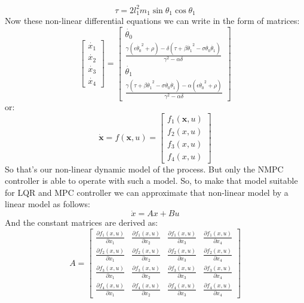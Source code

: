 \begin{equation}\tau = 2l^2_1m_1\sin\theta_1\cos\theta_1\end{equation}
Now these non-linear differential equations we can write in the form of matrices:
\begin{equation}\label{nonlinmodel}
\begin{bmatrix}
\dot{x_1} \\ \dot{x_2} \\ \dot{x_3} \\ \dot{x_4}
\end{bmatrix} = \begin{bmatrix}
\dot{\theta_0}\\
\frac{\gamma(\epsilon\dot{\theta_0}^2+\rho)-\delta(\tau+\beta\dot{\theta_1}^2-\sigma\dot{\theta_0}\dot{\theta_1})}{\gamma^2-\alpha\delta}\\
\dot{\theta_1}\\
 \frac{\gamma(\tau+\beta\dot{\theta_1}^2-\sigma\dot{\theta_0}\dot{\theta_1})-\alpha(\epsilon\dot{\theta_0}^2+\rho)}{\gamma^2-\alpha\delta}
\end{bmatrix}
\end{equation}
or:
\begin{equation}\dot{\textbf{x}} = f(\textbf{x},u) =\begin{bmatrix}f_1(\textbf{x},u)\\f_2(x,u)\\f_3(x,u)\\f_4(x,u)\end{bmatrix} \end{equation}
So that’s our non-linear dynamic model of the process. But only the NMPC controller is able to operate with such a model.  So, to make that model suitable for LQR and MPC controller we can approximate that non-linear model by a linear model as follows:
\begin{equation}\dot{x} = Ax + Bu\end{equation}
And the constant matrices are derived as:
\begin{equation}
A = \begin{bmatrix}
\frac{\partial f_1(x,u)}{\partial x_1}&\frac{\partial f_1(x,u)}{\partial x_2}&\frac{\partial f_1(x,u)}{\partial x_3}&\frac{\partial f_1(x,u)}{\partial x_4}\\
\frac{\partial f_2(x,u)}{\partial x_1}&\frac{\partial f_2(x,u)}{\partial x_2}&\frac{\partial f_2(x,u)}{\partial x_3}&\frac{\partial f_2(x,u)}{\partial x_4}\\
\frac{\partial f_3(x,u)}{\partial x_1}&\frac{\partial f_3(x,u)}{\partial x_2}&\frac{\partial f_3(x,u)}{\partial x_3}&\frac{\partial f_3(x,u)}{\partial x_4}\\
\frac{\partial f_4(x,u)}{\partial x_1}&\frac{\partial f_4(x,u)}{\partial x_2}&\frac{\partial f_4(x,u)}{\partial x_3}&\frac{\partial f_4(x,u)}{\partial x_4}
\end{bmatrix}
\end{equation}
